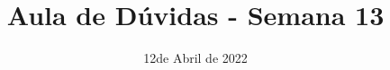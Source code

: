 \documentclass{beamer}
\title{Aula de Dúvidas - Semana 13}
\author[\autor]{\autor}
\institute[\instituto]{\instituto}
\date{12de Abril de 2022}
\begin{document}
    \begin{frame}
        \maketitle
    \end{frame}
\end{document}

